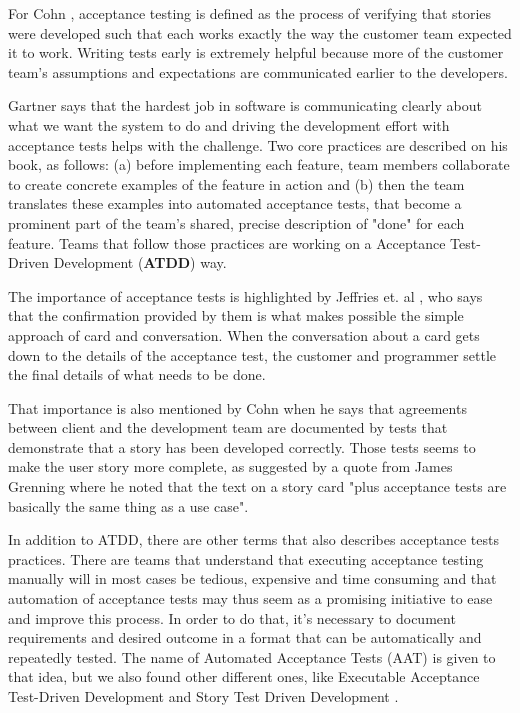 For Cohn \cite{Cohn_2004}, acceptance testing is defined as the process of verifying that stories were developed such that each works exactly the way the customer team expected it to work. Writing tests early is extremely helpful because more of the customer team’s assumptions and expectations are communicated earlier to the developers. 

Gartner \cite{Gartner_2012} says that the hardest job in software is communicating clearly about what we want the system to do and driving the development effort with acceptance tests helps with the challenge. Two core practices are described on his book, as follows: (a) before implementing each feature, team members collaborate to create concrete examples of the feature in action and (b) then the team translates these examples into automated
acceptance tests, that become a prominent part of the team's shared, precise description of "done" for each feature. Teams that follow those practices are working on a Acceptance Test-Driven Development (\textbf{ATDD}) way.

The importance of acceptance tests is highlighted by Jeffries et. al \cite{Jeffries_2001}, who says that the confirmation provided by them is what makes possible the simple approach of card and conversation. When the conversation about a card gets down to the details of the acceptance test, the customer and programmer settle the final details of what needs to be done.

That importance is also mentioned by Cohn \cite{Cohn_2004} when he says that agreements between client and the development team are documented by
tests that demonstrate that a story has been developed correctly. Those tests seems to make the user story more complete, as suggested by a quote from James Grenning where he noted that the text on a story card "plus acceptance tests are basically the same thing as a use case".

In addition to ATDD, there are other terms that also describes acceptance tests practices. There are teams that understand that executing acceptance testing manually will in most cases be tedious, expensive and time consuming and that automation of acceptance tests may thus seem as a promising initiative to ease and improve this process. In order to do that, it's necessary to document requirements and desired outcome in a format that can be automatically and repeatedly tested. The name of Automated Acceptance Tests (AAT) \cite{Haugset_and_Hanssen_2008} is given to that idea, but we also found other different ones, like Executable Acceptance Test-Driven Development \cite{Melnik_2007} and Story Test Driven Development \cite{Park_2010}.

